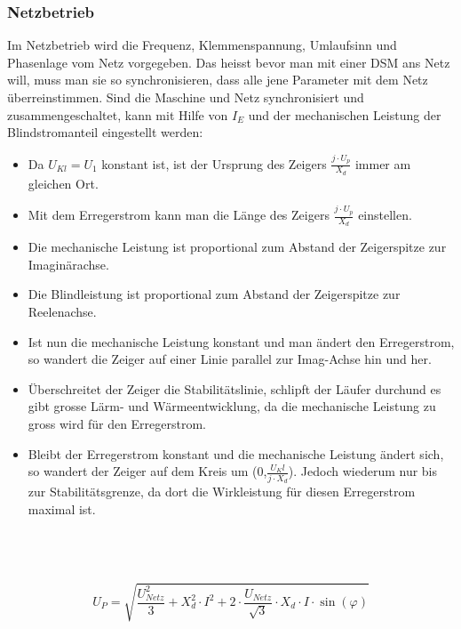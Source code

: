    \subsubsection{Netzbetrieb}
        Im Netzbetrieb wird die Frequenz, Klemmenspannung, Umlaufsinn und Phasenlage vom Netz vorgegeben. Das heisst bevor man mit einer DSM ans Netz will, muss man sie so synchronisieren, dass alle jene Parameter mit dem Netz überreinstimmen. Sind die Maschine und Netz synchronisiert und zusammengeschaltet, kann mit Hilfe von $I_E$ und der mechanischen Leistung der Blindstromanteil eingestellt werden: \\
        \begin{minipage}{8.2cm}
        \end{minipage}
        \begin{minipage}{9.7cm}
            \begin{itemize}
                \item Da $U_{Kl} = U_1$ konstant ist, ist der Ursprung des Zeigers $\frac{j \cdot U_p}{X_d}$ immer am gleichen Ort. 
                \item Mit dem Erregerstrom kann man die Länge des Zeigers $\frac{j \cdot U_p}{X_d}$ einstellen.
                \item Die mechanische Leistung ist proportional zum Abstand der Zeigerspitze zur Imaginärachse.
                \item Die Blindleistung ist proportional zum Abstand  der Zeigerspitze zur Reelenachse.
                \item Ist nun die mechanische Leistung konstant und man ändert den Erregerstrom, so wandert die Zeiger auf einer Linie parallel zur Imag-Achse hin und her.
                \item Überschreitet der Zeiger die Stabilitätslinie, schlipft der Läufer durchund es gibt grosse Lärm- und Wärmeentwicklung, da die mechanische Leistung zu gross wird für den Erregerstrom.
                \item Bleibt der Erregerstrom konstant und die mechanische Leistung ändert sich, so wandert der Zeiger auf dem Kreis um (0,$\frac{U_Kl}{j \cdot X_d}$). Jedoch wiederum nur bis zur Stabilitätsgrenze, da dort die Wirkleistung für diesen Erregerstrom maximal ist.
            \end{itemize}
        \end{minipage}
        \\ \\ \\
        $$ U_P = \sqrt{\frac{U^2_{Netz}}{3} + X_d^2 \cdot I^2 + 2 \cdot \frac{U_{Netz}}{\sqrt{3}}\cdot X_d \cdot I \cdot \sin(\varphi)} $$